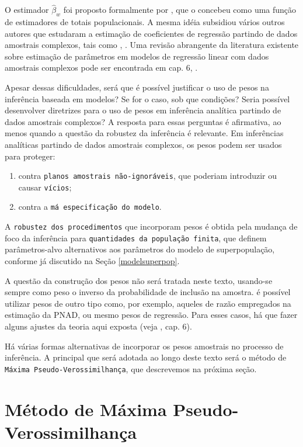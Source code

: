 \documentclass[]{book}
\numberwithin{example}{chapter}
\numberwithin{remark}{chapter}
\numberwithin{definition}{chapter}
\begin{document}
O estimador \(\widehat{\beta }_{w}\) foi proposto formalmente por
\citep{fuller75}, que o concebeu como uma função de estimadores de
totais populacionais. A mesma idéia subsidiou vários outros autores que
estudaram a estimação de coeficientes de regressão partindo de dados
amostrais complexos, tais como \citep{NH80}, \citep{PfefeNat}. Uma
revisão abrangente da literatura existente sobre estimação de parâmetros
em modelos de regressão linear com dados amostrais complexos pode ser
encontrada em cap. 6, \citep{Silva}.

Apesar dessas dificuldades, será que é possível justificar o uso de
pesos na inferência baseada em modelos? Se for o caso, sob que
condições? Seria possível desenvolver diretrizes para o uso de pesos em
inferência analítica partindo de dados amostrais complexos? A resposta
para essas perguntas é afirmativa, ao menos quando a questão da robustez
da inferência é relevante. Em inferências analíticas partindo de dados
amostrais complexos, os pesos podem ser usados para proteger:

\begin{enumerate}
\def\labelenumi{\arabic{enumi}.}
\item
  contra \texttt{planos\ amostrais\ não-ignoráveis}, que poderiam
  introduzir ou causar \texttt{vícios};
\item
  contra a \texttt{má\ especificação\ do\ modelo}.
\end{enumerate}

A \texttt{robustez\ dos\ procedimentos} que incorporam pesos é obtida
pela mudança de foco da inferência para
\texttt{quantidades\ da\ população\ finita}, que definem parâmetros-alvo
alternativos aos parâmetros do modelo de superpopulação, conforme já
discutido na Seção \ref{modelsuperpop}.

A questão da construção dos pesos não será tratada neste texto,
usando-se sempre como peso o inverso da probabilidade de inclusão na
amostra. é possível utilizar pesos de outro tipo como, por exemplo,
aqueles de razão empregados na estimação da PNAD, ou mesmo pesos de
regressão. Para esses casos, há que fazer alguns ajustes da teoria aqui
exposta (veja \citep{Silva}, cap. 6).

Há várias formas alternativas de incorporar os pesos amostrais no
processo de inferência. A principal que será adotada ao longo deste
texto será o método de \texttt{Máxima\ Pseudo-Verossimilhança}, que
descrevemos na próxima seção.

\section{Método de Máxima Pseudo-Verossimilhança}\label{modpar3}
\end{document}
